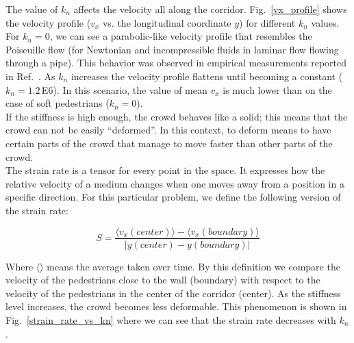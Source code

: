\documentclass[preprint,12pt]{elsarticle}
\begin{document}
The value of $k_n$ affects the velocity all along the corridor. Fig.~\ref{vx_profile} shows the velocity profile ($v_x$ vs. the longitudinal coordinate $y$) for different $k_n$ values. For $k_n=0$, we can see a parabolic-like velocity profile that resembles the Poiseuille flow (for Newtonian and incompressible fluids in laminar flow flowing through a pipe). This behavior was observed in empirical measurements reported in Ref.~\cite{zhang2013empirical}. As $k_n$ increases the velocity profile flattens until becoming a constant ($k_n=1.2\,$E6). In this scenario, the value of mean $v_x$ is much lower than on the case of soft pedestrians ($k_n=$0).\\

If the stiffness is high enough, the crowd behaves like a solid; this means that the crowd can not be easily ``deformed''. In this context, to deform means to have certain parts of the crowd that manage to move faster than other parts of the crowd. \\

The strain rate is a tensor for every point in the space. It expresses how the relative velocity of a medium changes when one moves away from a position in a specific direction. For this particular problem, we define the following version of the strain rate:

\begin{equation}
S = \frac{\langle v_x(center)\rangle - \langle v_x(boundary)\rangle }{\left | y(center) - y(boundary) \right |} 
\end{equation}

Where $\langle \rangle$ means the average taken over time. By this definition we compare the velocity of the pedestrians close to the wall (boundary) with respect to the velocity of the pedestrians in the center of the corridor (center). As the stiffness level increases, the crowd becomes less deformable. This phenomenon is shown in Fig.~\ref{strain_rate_vs_kn} where we can see that the strain rate decreases with $k_n$. \\
\end{document}
